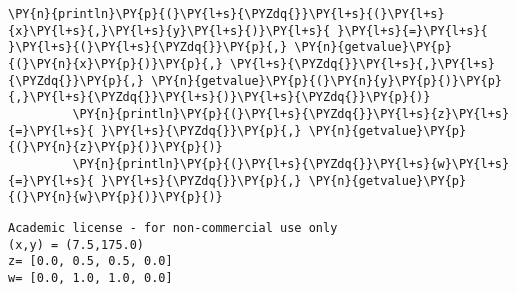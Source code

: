 \begin{codeCell}
\begin{Verbatim}[commandchars=\\\{\}]
         \PY{n}{println}\PY{p}{(}\PY{l+s}{\PYZdq{}}\PY{l+s}{(}\PY{l+s}{x}\PY{l+s}{,}\PY{l+s}{y}\PY{l+s}{)}\PY{l+s}{ }\PY{l+s}{=}\PY{l+s}{ }\PY{l+s}{(}\PY{l+s}{\PYZdq{}}\PY{p}{,} \PY{n}{getvalue}\PY{p}{(}\PY{n}{x}\PY{p}{)}\PY{p}{,} \PY{l+s}{\PYZdq{}}\PY{l+s}{,}\PY{l+s}{\PYZdq{}}\PY{p}{,} \PY{n}{getvalue}\PY{p}{(}\PY{n}{y}\PY{p}{)}\PY{p}{,}\PY{l+s}{\PYZdq{}}\PY{l+s}{)}\PY{l+s}{\PYZdq{}}\PY{p}{)}
         \PY{n}{println}\PY{p}{(}\PY{l+s}{\PYZdq{}}\PY{l+s}{z}\PY{l+s}{=}\PY{l+s}{ }\PY{l+s}{\PYZdq{}}\PY{p}{,} \PY{n}{getvalue}\PY{p}{(}\PY{n}{z}\PY{p}{)}\PY{p}{)}
         \PY{n}{println}\PY{p}{(}\PY{l+s}{\PYZdq{}}\PY{l+s}{w}\PY{l+s}{=}\PY{l+s}{ }\PY{l+s}{\PYZdq{}}\PY{p}{,} \PY{n}{getvalue}\PY{p}{(}\PY{n}{w}\PY{p}{)}\PY{p}{)}
\end{Verbatim}
    \begin{Verbatim}[commandchars=\\\{\}]
Academic license - for non-commercial use only
(x,y) = (7.5,175.0)
z= [0.0, 0.5, 0.5, 0.0]
w= [0.0, 1.0, 1.0, 0.0]
    \end{Verbatim}

\end{codeCell}
